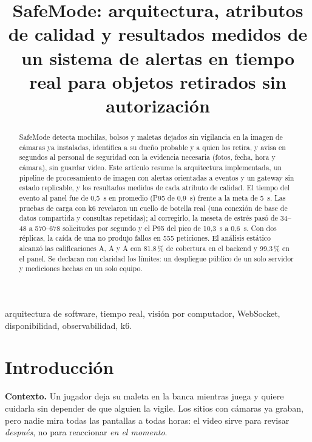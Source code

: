 \documentclass[conference]{IEEEtran}
\begin{document}
\title{SafeMode: arquitectura, atributos de calidad y resultados medidos de un sistema de alertas en tiempo real para objetos retirados sin autorización}

\author{
}

\maketitle

\begin{abstract}
SafeMode detecta mochilas, bolsos y maletas dejados sin vigilancia en la imagen de cámaras ya instaladas, identifica a su dueño probable y a quien
los retira, y avisa en segundos al personal de seguridad con la evidencia necesaria (fotos, fecha, hora y cámara), sin guardar video. Este artículo
resume la arquitectura implementada, un pipeline de procesamiento de imagen con alertas orientadas a eventos y un gateway sin estado replicable,
y los resultados medidos de cada atributo de calidad. El tiempo del evento al panel fue de 0,5~s en promedio (P95 de 0,9~s) frente a la meta de
5~s. Las pruebas de carga con k6 revelaron un cuello de botella real (una conexión de base de datos compartida y consultas repetidas); al corregirlo, la
meseta de estrés pasó de 34--48 a 570--678 solicitudes por segundo y el P95 del pico de 10,3~s a 0,6~s. Con dos réplicas, la caída de una no produjo
fallos en 555 peticiones. El análisis estático alcanzó las calificaciones A, A y A con 81,8\,\% de cobertura en el backend y 99,3\,\% en el panel.
Se declaran con claridad los límites: un despliegue público de un solo servidor y mediciones hechas en un solo equipo.
\end{abstract}

\begin{IEEEkeywords}
arquitectura de software, tiempo real, visión por computador, WebSocket, disponibilidad, observabilidad, k6.
\end{IEEEkeywords}

\section{Introducción}
\textbf{Contexto.} Un jugador deja su maleta en la banca mientras juega y quiere cuidarla sin depender de que alguien la vigile. Los sitios con cámaras
ya graban, pero nadie mira todas las pantallas a todas horas: el video sirve para revisar \emph{después}, no para reaccionar \emph{en el momento}.
\end{document}
